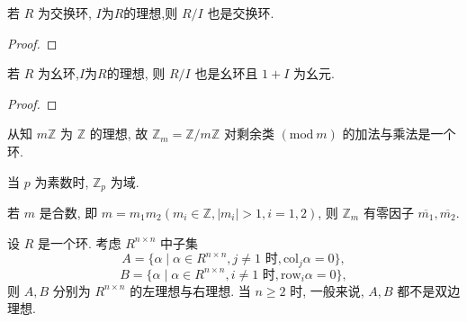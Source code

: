 \documentclass[../../main.tex]{subfiles}%
\begin{document}
\begin{corollary}\label{corollary:抽象代数-推论 1.4.1}
若 \( R \) 为交换环, $I$为$R$的理想,则 \( R/I \) 也是交换环.
\end{corollary}
\begin{proof}



\end{proof}

\begin{corollary}\label{corollary:抽象代数-推论 1.4.2}
若 \( R \) 为幺环,$I$为$R$的理想, 则 \( R/I \) 也是幺环且 \( 1 + I \) 为幺元.
\end{corollary}
\begin{proof}



\end{proof}

\begin{example}
从知 \( m\mathbb{Z} \) 为 \( \mathbb{Z} \) 的理想, 故 \( \mathbb{Z}_m = \mathbb{Z}/m\mathbb{Z} \) 对剩余类 \( (\text{mod}\ m) \) 的加法与乘法是一个环.

当 \( p \) 为素数时, \( \mathbb{Z}_p \) 为域.

若 \( m \) 是合数, 即 \( m = m_1m_2 (m_i \in \mathbb{Z}, |m_i| > 1, i = 1,2) \), 则 \( \mathbb{Z}_m \) 有零因子 \( \overline{m_1}, \overline{m_2} \).
\end{example}

\begin{example}
设 \( R \) 是一个环. 考虑 \( R^{n \times n} \) 中子集
\[
A = \{\alpha \mid \alpha \in R^{n \times n}, j \neq 1 \text{ 时}, \text{col}_j\alpha = 0\},
\]
\[
B = \{\alpha \mid \alpha \in R^{n \times n}, i \neq 1 \text{ 时}, \text{row}_i\alpha = 0\},
\]
则 \( A, B \) 分别为 \( R^{n \times n} \) 的左理想与右理想. 当 \( n \geqslant 2 \) 时, 一般来说, \( A, B \) 都不是双边理想.
\end{example}
\end{document}
